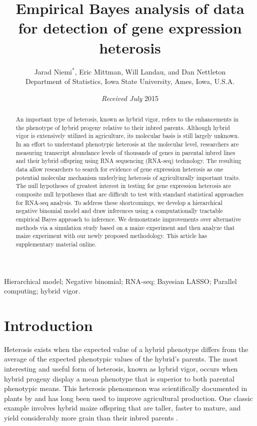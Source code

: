 \documentclass[useAMS,usenatbib,referee]{biom}
\title{Empirical Bayes analysis of \RNAseq{} data for detection of gene expression heterosis}
\author{Jarad Niemi$^*$\email{niemi@iastate.edu}, 
Eric Mittman, 
Will Landau, and 
Dan Nettleton \\
Department of Statistics, Iowa State University, Ames, Iowa, U.S.A.}
\newcommand{\RNAseq}{RNA-seq}
\begin{document}
\date{{\it Received July} 2015} 

\pagerange{\pageref{firstpage}--\pageref{lastpage}} 

\label{firstpage}

\begin{abstract}
An important type of heterosis, known as hybrid vigor, refers to the enhancements in the phenotype of hybrid progeny relative to their inbred parents. Although hybrid vigor is extensively utilized in agriculture, its molecular basis  is still largely unknown. In an effort to understand phenotypic heterosis at the molecular level, researchers are measuring transcript abundance levels of thousands of genes in parental inbred lines and their hybrid offspring using RNA sequencing (\RNAseq{}) technology.  The resulting data allow researchers to search for evidence of gene expression heterosis as one potential molecular mechanism underlying heterosis of agriculturally important traits.  The null hypotheses of greatest interest in testing for gene expression heterosis are composite null hypotheses that are difficult to test with standard statistical approaches for \RNAseq{} analysis. To address these shortcomings, we develop a hierarchical negative binomial model and draw inferences using a computationally tractable empirical Bayes approach to inference. We demonstrate improvements over alternative methods via a simulation study based on a maize experiment and then analyze that maize experiment with our newly proposed methodology. 
This article has supplementary material online.
\end{abstract}

\begin{keywords}
Hierarchical model; Negative binomial; \RNAseq{}; Bayesian LASSO; Parallel computing; hybrid vigor.
\end{keywords}

\maketitle


\section{Introduction}
\label{s:intro}

Heterosis exists when the expected value of a hybrid phenotype differs from the average of the expected phenotypic values of the hybrid's parents.  The most interesting and useful form of heterosis, known as hybrid vigor, occurs when hybrid progeny display a mean phenotype that is superior to  both parental phenotypic means.  This heterosis phenomenon was scientifically documented in plants by \cite{darwin1876effects} and has long been used to improve agricultural production. One classic example involves hybrid maize offspring that are taller, faster to mature, and yield considerably more grain than their inbred parents \citep{hallauer1981quantitative, hallauer2010quantitative}.
\end{document}
